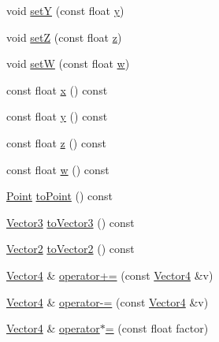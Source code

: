 \begin{DoxyCompactItemize}
void \hyperlink{classprism_1_1geometry_1_1_vector4_aa2a12efbe808541fd074e232df840139}{setY} (const float \hyperlink{classprism_1_1geometry_1_1_vector4_aeef667182bad6260883233fb6ed4248a}{y})
\item 
void \hyperlink{classprism_1_1geometry_1_1_vector4_a9adf1f89f84ddb922f510f2054474410}{setZ} (const float \hyperlink{classprism_1_1geometry_1_1_vector4_ac6275f95eecc62b403886b32f3b24c5d}{z})
\item 
void \hyperlink{classprism_1_1geometry_1_1_vector4_a248668608c8464a8366bf7cc67990300}{setW} (const float \hyperlink{classprism_1_1geometry_1_1_vector4_ad73085ed28fd83da5aa68c6383d94f05}{w})
\item 
const float \hyperlink{classprism_1_1geometry_1_1_vector4_ac97118cafe75aaba4749b32f40bbf566}{x} () const 
\item 
const float \hyperlink{classprism_1_1geometry_1_1_vector4_aeef667182bad6260883233fb6ed4248a}{y} () const 
\item 
const float \hyperlink{classprism_1_1geometry_1_1_vector4_ac6275f95eecc62b403886b32f3b24c5d}{z} () const 
\item 
const float \hyperlink{classprism_1_1geometry_1_1_vector4_ad73085ed28fd83da5aa68c6383d94f05}{w} () const 
\item 
\hyperlink{classprism_1_1geometry_1_1_point}{Point} \hyperlink{classprism_1_1geometry_1_1_vector4_ac4cd49be6613587e7f788df1e38d6f35}{to\+Point} () const 
\item 
\hyperlink{classprism_1_1geometry_1_1_vector3}{Vector3} \hyperlink{classprism_1_1geometry_1_1_vector4_aed537e2b31ac530ec1a0ffcb1e9c1e6c}{to\+Vector3} () const 
\item 
\hyperlink{classprism_1_1geometry_1_1_vector2}{Vector2} \hyperlink{classprism_1_1geometry_1_1_vector4_a0aa3ddf5390d0bc16dc7dadac1571db6}{to\+Vector2} () const 
\item 
\hyperlink{classprism_1_1geometry_1_1_vector4}{Vector4} \& \hyperlink{classprism_1_1geometry_1_1_vector4_adeb24224d3d6da841e407acb4465c7bc}{operator+=} (const \hyperlink{classprism_1_1geometry_1_1_vector4}{Vector4} \&v)
\item 
\hyperlink{classprism_1_1geometry_1_1_vector4}{Vector4} \& \hyperlink{classprism_1_1geometry_1_1_vector4_aef98cc66475c18735c400f4a475a8735}{operator-\/=} (const \hyperlink{classprism_1_1geometry_1_1_vector4}{Vector4} \&v)
\item 
\hyperlink{classprism_1_1geometry_1_1_vector4}{Vector4} \& \hyperlink{classprism_1_1geometry_1_1_vector4_aa25f25cf491506a4a5ac0e772913d292}{operator$\ast$=} (const float factor)

\end{DoxyCompactItemize}
